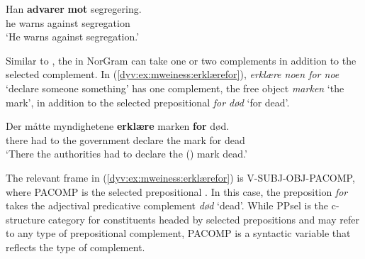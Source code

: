 \documentclass[output=paper]{langsci/langscibook}
\begin{document}
\ea\label{dyv:ex:mweiness:advaremot}
\gll   Han \textbf{advarer} \textbf{mot} segregering. \\
        he warns against segregation\\
\glt  `He warns against segregation.' \\ 
\z

Similar to , the  in NorGram can take one or two complements in addition to the selected complement. 
In (\ref{dyv:ex:mweiness:erklærefor}), \emph{erklære noen for noe} `declare someone something' has one complement, the free object \emph{marken} `the mark',  in addition to the selected prepositional   \emph{for død} `for dead'. 

\ea\label{dyv:ex:mweiness:erklærefor}
\gll   Der måtte myndighetene \textbf{erklære} marken \textbf{for} død. \\
        there {had to} {the government} declare {the mark} for dead \\
\glt `There the authorities had to declare the () mark dead.'\\ 
\z

The relevant frame in (\ref{dyv:ex:mweiness:erklærefor}) is \textsf{V-SUBJ-OBJ-PACOMP}, where \textsf{PACOMP} is the selected prepositional .
In this case, the preposition \emph{for} takes the adjectival predicative complement \emph{død} `dead'. %
While \textsf{PPsel} is the c-structure category for constituents headed by selected prepositions and may refer to any type of prepositional complement, \textsf{PACOMP} is a syntactic variable that reflects the type of complement. %
\end{document}
